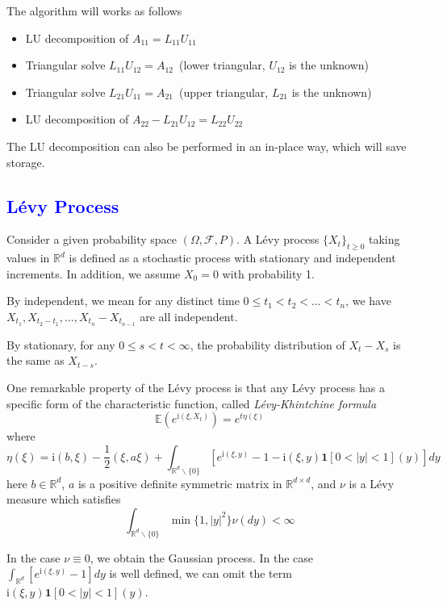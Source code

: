 \documentclass[10pt,a4paper]{article}
\newcommand{\ii}[0]{\mathrm{i}}
\newcommand{\RR}[0]{\mathbb{R}}
\newcommand{\lib}[1]{\textcolor{blue}{\section{#1}}}
\theoremstyle{definition}
\begin{document}
The algorithm will works as follows
\begin{itemize}
	\item LU decomposition of $A_{11}=L_{11}U_{11}$
	\item Triangular solve $L_{11}U_{12}=A_{12}$~(lower triangular, $U_{12}$ is the unknown)
	\item Triangular solve $L_{21}U_{11} = A_{21}$~(upper triangular, $L_{21}$ is the unknown)
	\item LU decomposition of $A_{22}-L_{21}U_{12}=L_{22}U_{22}$
\end{itemize}	

The LU decomposition can also be performed in an in-place way, which will save storage. 
\lib{L\'evy Process}

Consider a given probability space $(\Omega, \mathcal{F}, P)$. A L\'evy process $\{X_t\}_{t\geq 0}$ taking values in $\RR^d$ is defined as a stochastic process with stationary and independent increments. In addition, we assume $X_0=0$ with probability 1. 

By independent, we mean for any distinct time $0\leq t_1<t_2<\ldots<t_n$, we have $X_{t_1}, X_{t_2-t_1}, \ldots, X_{t_n}-X_{t_{n-1}}$ are all independent. 

By stationary,  for any $0\leq s < t <\infty$, the probability distribution of $X_t-X_s$ is the same as $X_{t-s}$.

One remarkable property of the L\'evy process is that any L\'evy process has a specific form of the characteristic function, called \textit{L\'evy-Khintchine formula}
\begin{equation}
	\mathbb{E}(e^{\ii (\xi, X_t)}) = e^{t\eta(\xi)}
\end{equation}
where
\begin{equation}\label{equ:eta}
	\eta(\xi) = \ii (b, \xi) - \frac{1}{2}(\xi, a\xi) + \int_{\RR^d\backslash \{0\}} \left[ e^{\ii (\xi, y)}-1-\ii (\xi, y)\mathbf{1}[0<|y|<1](y) \right]dy
\end{equation}
here $b\in \RR^d$, $a$ is a positive definite symmetric matrix in $\RR^{d\times d}$, and $\nu$ is a L\'evy measure which satisfies
\begin{equation}
	\int_{\RR^d\backslash \{0\}} \min\{1, |y|^2\}\nu(dy)<\infty
\end{equation}

In the case $\nu\equiv 0$, we obtain the Gaussian process. In the case $\int_{\RR^d} \left[ e^{\ii (\xi, y)}-1\right]dy$ is well defined, we can omit the term $\ii (\xi, y)\mathbf{1}[0<|y|<1](y)$. 
\end{document}
